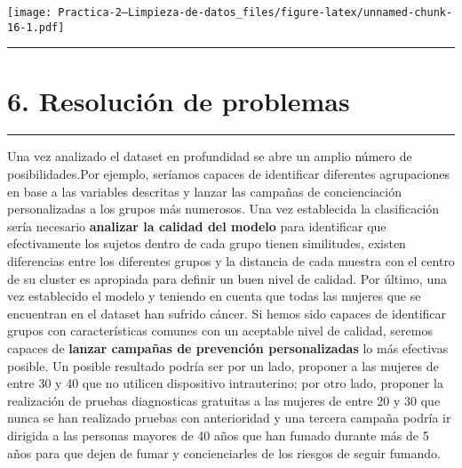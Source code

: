 \documentclass[
]{article}
\begin{document}
\texttt{[image: Practica-2---Limpieza-de-datos\_files/figure-latex/unnamed-chunk-16-1.pdf]}

\begin{center}\rule{0.5\linewidth}{0.5pt}\end{center}

\hypertarget{resoluciuxf3n-de-problemas}{%
\section{6. Resolución de problemas}\label{resoluciuxf3n-de-problemas}}

\begin{center}\rule{0.5\linewidth}{0.5pt}\end{center}

Una vez analizado el dataset en profundidad se abre un amplio número de
posibilidades.Por ejemplo, seríamos capaces de identificar diferentes
agrupaciones en base a las variables descritas y lanzar las campañas de
concienciación personalizadas a los grupos más numerosos. Una vez
establecida la clasificación sería necesario \textbf{analizar la calidad
del modelo} para identificar que efectivamente los sujetos dentro de
cada grupo tienen similitudes, existen diferencias entre los diferentes
grupos y la distancia de cada muestra con el centro de su cluster es
apropiada para definir un buen nivel de calidad. Por último, una vez
establecido el modelo y teniendo en cuenta que todas las mujeres que se
encuentran en el dataset han sufrido cáncer. Si hemos sido capaces de
identificar grupos con características comunes con un aceptable nivel de
calidad, seremos capaces de \textbf{lanzar campañas de prevención
personalizadas} lo más efectivas posible. Un posible resultado podría
ser por un lado, proponer a las mujeres de entre 30 y 40 que no utilicen
dispositivo intrauterino; por otro lado, proponer la realización de
pruebas diagnosticas gratuitas a las mujeres de entre 20 y 30 que nunca
se han realizado pruebas con anterioridad y una tercera campaña podría
ir dirigida a las personas mayores de 40 años que han fumado durante más
de 5 años para que dejen de fumar y concienciarles de los riesgos de
seguir fumando.
\end{document}
